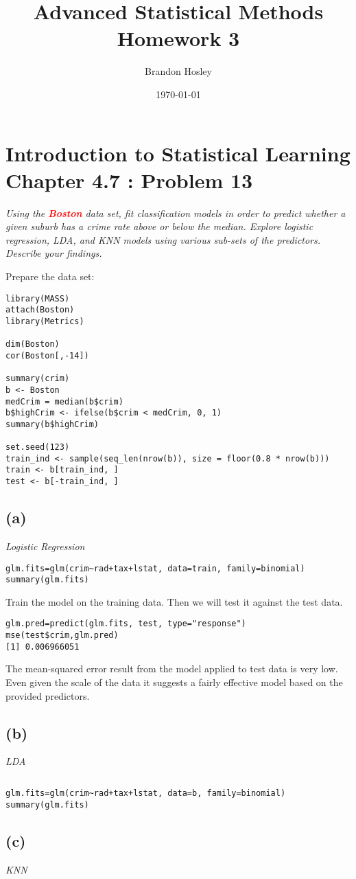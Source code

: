 \documentclass[a4paper,man,natbib]{apa6}
\title{Advanced Statistical Methods Homework 3}
\author{Brandon Hosley}
\date{\today}
\affiliation{University of Illinois - Springfield}
\begin{document}
\maketitle
\singlespacing

\section{Introduction to Statistical Learning \\ Chapter 4.7 : Problem 13}
\emph{
Using the \textbf{\textcolor{red}{Boston}} data set, 
fit classification models in order to predict
whether a given suburb has a crime rate above or below the median.
Explore logistic regression, LDA, and KNN models using various sub-sets of the predictors. Describe your findings.}

Prepare the data set:

\begin{verbatim}
library(MASS)
attach(Boston)
library(Metrics)

dim(Boston)
cor(Boston[,-14])

summary(crim)
b <- Boston
medCrim = median(b$crim)
b$highCrim <- ifelse(b$crim < medCrim, 0, 1)
summary(b$highCrim)

set.seed(123)
train_ind <- sample(seq_len(nrow(b)), size = floor(0.8 * nrow(b)))
train <- b[train_ind, ]
test <- b[-train_ind, ]
\end{verbatim}

\subsection{(a)} 
\emph{Logistic Regression}
\begin{verbatim}
glm.fits=glm(crim~rad+tax+lstat, data=train, family=binomial)
summary(glm.fits)
\end{verbatim}

Train the model on the training data. Then we will test it against the test data.

\begin{verbatim}
glm.pred=predict(glm.fits, test, type="response")
mse(test$crim,glm.pred)
[1] 0.006966051
\end{verbatim}

The mean-squared error result from the model applied to test data is very low.
Even given the scale of the data it suggests a fairly effective model based on the provided predictors.

\subsection{(b)}
\emph{LDA}
\begin{verbatim}
\end{verbatim}

\begin{verbatim}
glm.fits=glm(crim~rad+tax+lstat, data=b, family=binomial)
summary(glm.fits)
\end{verbatim}

\subsection{(c)}
\emph{KNN}
\begin{verbatim}
\end{verbatim}
	
\end{document}
